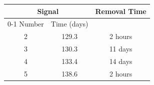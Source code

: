 \begin{tabular}{|cc|c|}
\hline
\multicolumn{2}{|c|}{Signal} & \multirow{2}{*}{Removal Time} \\
\cline{0-1}
Number & Time (days) &  \\
\hline
2 & 129.3 & 2 hours \\
3 & 130.3 & 11 days \\
4 & 133.4 & 14 days \\
5 & 138.6 & 2 hours \\
\hline
\end{tabular}
